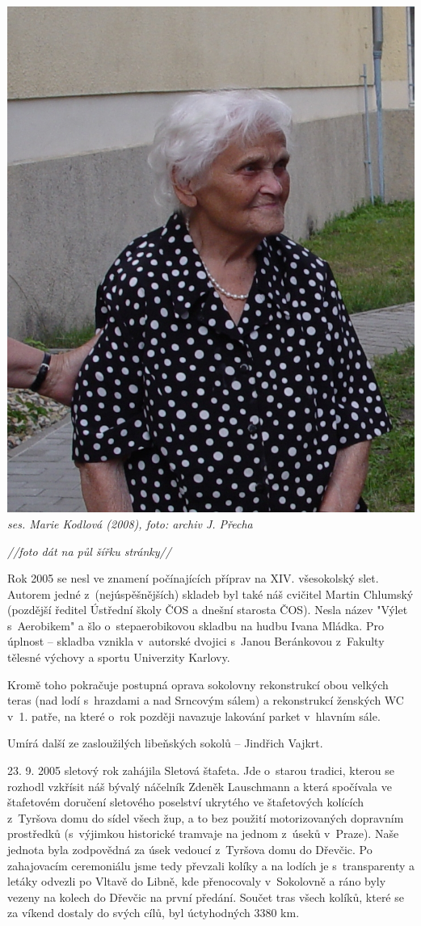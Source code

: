 \documentclass[a5paper, 11pt, twoside]{article}
\begin{document}
 \includegraphics[width=\textwidth]{img/50_manka.jpg}
\textit{ses. Marie Kodlová (2008), foto: archiv J. Přecha}

\textit{//foto dát na půl šířku stránky//}

Rok 2005 se nesl ve znamení počínajících příprav na XIV. všesokolský
slet. Autorem jedné z~(nejúspěšnějších) skladeb byl také náš cvičitel
Martin Chlumský (pozdější ředitel Ústřední školy ČOS a dnešní starosta
ČOS). Nesla název "Výlet s~Aerobikem" a šlo o~stepaerobikovou skladbu
na hudbu Ivana Mládka. Pro úplnost -- skladba vznikla v~autorské dvojici
s~Janou Beránkovou z~Fakulty tělesné výchovy a sportu Univerzity
Karlovy.

Kromě toho pokračuje postupná oprava sokolovny rekonstrukcí obou velkých
teras (nad lodí s~hrazdami a nad Srncovým sálem) a rekonstrukcí ženských
WC v~1. patře, na které o~rok později navazuje lakování parket v~hlavním
sále.

Umírá další ze zasloužilých libeňských sokolů -- Jindřich Vajkrt.

23. 9. 2005 sletový rok zahájila Sletová štafeta. Jde o~starou tradici,
kterou se rozhodl vzkřísit náš bývalý náčelník Zdeněk Lauschmann a která
spočívala ve štafetovém doručení sletového poselství ukrytého ve
štafetových kolících z~Tyršova domu do sídel všech žup, a to bez použití
motorizovaných dopravním prostředků (s~výjimkou historické tramvaje na
jednom z~úseků v~Praze). Naše jednota byla zodpovědná za úsek vedoucí
z~Tyršova domu do Dřevčic. Po zahajovacím ceremoniálu jsme tedy převzali
kolíky a na lodích je s~transparenty a letáky odvezli po Vltavě do
Libně, kde přenocovaly v~Sokolovně a ráno byly vezeny na kolech do
Dřevčic na první předání. Součet tras všech kolíků, které se za víkend
dostaly do svých cílů, byl úctyhodných 3380 km.
\end{document}
